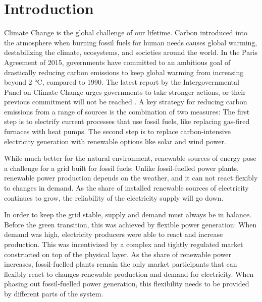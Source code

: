 
\chapter{Introduction}\label{Introduction}
Climate Change is the global challenge of our lifetime. Carbon introduced into the atmosphere when burning fossil fuels for human needs causes global warming, destabilizing the climate, ecosystems, and societies around the world.
In the Paris Agreement of 2015, governments have committed to an ambitious goal of drastically reducing carbon emissions to keep global warming from increasing beyond 2 °C, compared to 1990.
The latest report by the Intergovernmental Panel on Climate Change  urges governments to take stronger actions, or their previous commitment will not be reached \citep{portner2022ClimateChange2022}.
A key strategy for reducing carbon emissions from a range of sources is the combination of two measures: The first step is to electrify current processes that use fossil fuels, like replacing gas-fired furnaces with heat pumps. The second step is to replace carbon-intensive electricity generation with renewable options like solar and wind power.

While much better for the natural environment, renewable sources of energy pose a challenge for a grid built for fossil fuels:
Unlike fossil-fuelled power plants, renewable power production depends on the weather, and it can not react flexibly to changes in demand.
As the share of installed renewable sources of electricity continues to grow, the reliability of the electricity supply will go down.

In order to keep the grid stable, supply and demand must always be in balance. Before the green transition, this was achieved by flexible power generation: When demand was high, electricity producers were able to react and increase production.
This was incentivized by a complex and tightly regulated market constructed on top of the physical layer.
As the share of renewable power increases, fossil-fuelled plants remain the only market participants that can flexibly react to changes renewable production and demand for electricity.
When phasing out fossil-fuelled power generation, this flexibility needs to be provided by different parts of the system.

